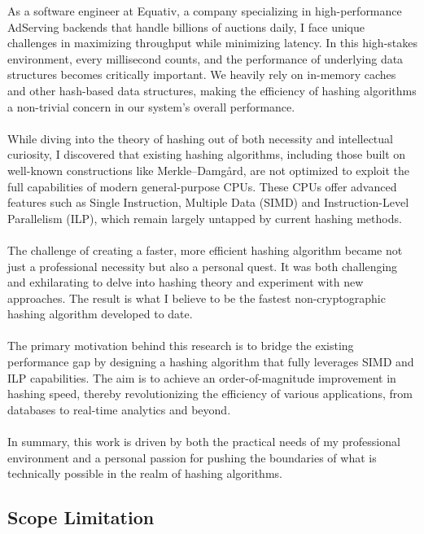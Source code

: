 \documentclass[10pt]{article}
\begin{document}
As a software engineer at Equativ, a company specializing in high-performance AdServing backends that handle billions of auctions daily,
I face unique challenges in maximizing throughput while minimizing latency. In this high-stakes environment, every millisecond counts,
and the performance of underlying data structures becomes critically important. We heavily rely on in-memory caches and other hash-based data structures,
making the efficiency of hashing algorithms a non-trivial concern in our system's overall performance.\\\\
While diving into the theory of hashing out of both necessity and intellectual curiosity, I discovered that existing hashing algorithms,
including those built on well-known constructions like Merkle–Damgård, are not optimized to exploit the full capabilities of modern general-purpose CPUs.
These CPUs offer advanced features such as Single Instruction, Multiple Data (SIMD) and Instruction-Level Parallelism (ILP), which remain largely untapped
by current hashing methods.\\\\
The challenge of creating a faster, more efficient hashing algorithm became not just a professional necessity but also a personal quest.
It was both challenging and exhilarating to delve into hashing theory and experiment with new approaches. The result is what I believe to be the fastest
non-cryptographic hashing algorithm developed to date.\\\\
The primary motivation behind this research is to bridge the existing performance gap by designing a hashing algorithm that fully leverages SIMD and ILP
capabilities. The aim is to achieve an order-of-magnitude improvement in hashing speed, thereby revolutionizing the efficiency of various applications,
from databases to real-time analytics and beyond.\\\\
In summary, this work is driven by both the practical needs of my professional environment and a personal passion for pushing the boundaries of what is
technically possible in the realm of hashing algorithms.

\subsection{Scope Limitation}
\end{document}
